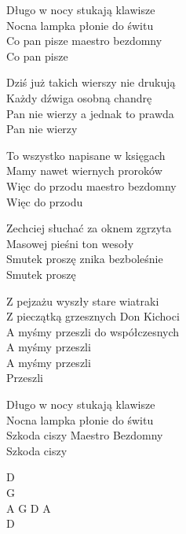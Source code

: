 \begin{text}
    Długo w nocy stukają klawisze\\
    Nocna lampka płonie do świtu\\
    Co pan pisze maestro bezdomny\\
    Co pan pisze

    Dziś już takich wierszy nie drukują\\
    Każdy dźwiga osobną chandrę\\
    Pan nie wierzy a jednak to prawda\\
    Pan nie wierzy

    To wszystko napisane w księgach\\
    Mamy nawet wiernych proroków\\
    Więc do przodu maestro bezdomny\\
    Więc do przodu

    Zechciej słuchać za oknem zgrzyta\\
    Masowej pieśni ton wesoły\\
    Smutek proszę znika bezboleśnie\\
    Smutek proszę

    Z pejzażu wyszły stare wiatraki\\
    Z pieczątką grzesznych Don Kichoci\\
    A myśmy przeszli do współczesnych\\
    A myśmy przeszli\\
    A myśmy przeszli\\
    Przeszli

    Długo w nocy stukają klawisze\\
    Nocna lampka płonie do świtu\\
    Szkoda ciszy Maestro Bezdomny\\
    Szkoda ciszy
\end{text}
\begin{chord}
    D\\
    G\\
    A G D A\\
    D
\end{chord}